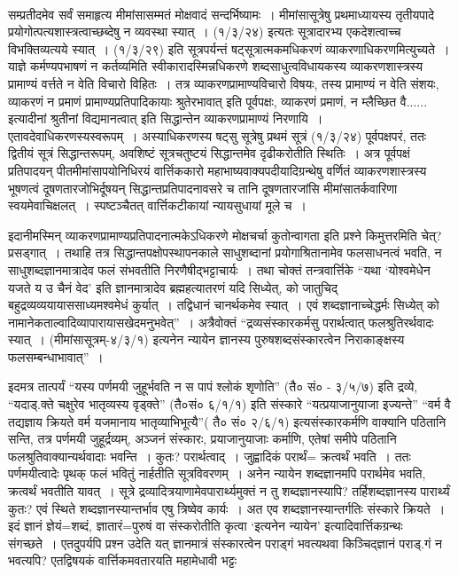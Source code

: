 {~\\[0.2cm]
सम्प्रतीदमेव सर्वं समाहृत्य मीमांसासम्मतं मोक्षवादं सन्दर्भिष्यामः~। मीमांसासूत्रेषु प्रथमाध्यायस्य तृतीयपादे प्रयोगोत्पत्यशास्त्रत्वाच्छब्देषु न व्यवस्था स्यात्~। (१/३/२४) इत्यतः सूत्रादारभ्य एकदेशत्वाच्च विभक्तिव्यत्यये स्यात्~। (१/३/२९) इति सूत्रपर्यन्तं षट्सूत्रात्मकमधिकरणं व्याकरणाधिकरणमित्युच्यते~।  याज्ञे कर्मण्यपभाषणं न कर्तव्यमिति स्वीकारादस्मिन्नधिकरणे शब्दसाधुत्वविधायकस्य व्याकरणशास्त्रस्य प्रामाण्यं वर्त्तते न वेति विचारो विहितः~। तत्र व्याकरणप्रामाण्यविचारो विषयः, तस्य प्रामाण्यं न वेति संशयः, व्याकरणं न प्रमाणं प्रामाण्यप्रतिपादिकायाः श्रुतेरभावात् इति पूर्वपक्षः, व्याकरणं प्रमाणं, न म्लैच्छित वै...... इत्यादीनां श्रुतीनां विद्यमानत्वात् इति सिद्धान्तेन व्याकरणप्रामाण्यं निरणायि~। एतावदेवाधिकरणस्यस्वरूपम्~। अस्याधिकरणस्य षट्सु सूत्रेषु प्रथमं सूत्रं (१/३/२४) पूर्वपक्षपरं, ततः द्वितीयं सूत्रं सिद्धान्तरूपम्, अवशिष्टं सूत्रचतुष्टयं सिद्धान्तमेव दृढीकरोतीति स्थितिः~। अत्र पूर्वपक्षं प्रतिपादयन् पीतमीमांसापयोनिधिरयं वार्त्तिककारो महाभाष्यवाक्यपदीयादिग्रन्थेषु वर्णितं व्याकरणशास्त्रस्य भूषणत्वं दूषणतारजोभिर्दूषयन् सिद्धान्तप्रतिपादनावसरे च तानि दूषणतारजांसि मीमांसातर्कवारिणा स्वयमेवाचिक्षलत्~। स्पष्टञ्चैतत् वार्त्तिकटीकायां न्यायसुधायां मूले च~। 

इदानीमस्मिन् व्याकरणप्रामाण्यप्रतिपादनात्मकेऽधिकरणे मोक्षचर्चा कुतोन्वागता इति प्रश्ने किमुत्तरमिति चेत्? प्रसड्गात्~। तथाहि तत्र सिद्धान्तपक्षोपस्थापनकाले साधुशब्दानां प्रयोगाश्रितानामेव फलसाधनत्वं भवति, न साधुशब्दज्ञानमात्रादेव फलं संभवतीति निरणैषीद्भट्टाचार्यः~। तथा चोक्तं तन्त्रवार्त्तिके “यथा ‘योश्वमेधेन यजते य उ चैनं वेद’ इति ज्ञानमात्रादेव ब्रह्महत्यातरणं यदि सिध्येत्, को जातुचिद् बहुद्रव्यव्ययायाससाध्यमश्वमेधं कुर्यात्~। तद्विधानं चानर्थकमेव स्यात्~। एवं शब्दज्ञानाच्चेद्धर्मः सिध्येत् को नामानेकताल्वादिव्यापारायासखेदमनुभवेत्”~। अत्रैवोक्तं “द्रव्यसंस्कारकर्मसु परार्थत्वात् फलश्रुतिरर्थवादः स्यात्~। (मीमांसासूत्रम्-४/३/१) इत्यनेन न्यायेन ज्ञानस्य पुरुषशब्दसंस्कारत्वेन निराकाङ्क्षस्य फल\-सम्बन्धाभावात्”~। 

इदमत्र तात्पर्यं  “यस्य पर्णमयी जुहूर्भवति न स पापं श्लोकं शृणोति” (तै० सं० - ३/५/७) इति द्रव्ये, “यदाड्.क्ते चक्षुरेव भातृव्यस्य वृड्क्ते” (तै०सं० ६/­१/१) इति संस्कारे “यत्प्रयाजानुयाजा इज्यन्ते” “वर्म वै तद्यज्ञाय क्रियते वर्म यजमानाय भातृव्याभिभूत्यै”\break ( तै० सं० २/६/१) इत्यसंस्कारकर्मणि वाक्यानि पठितानि सन्ति, तत्र पर्णमयी जुहूर्द्रव्यम्, अञ्जनं संस्कारः, प्रयाजानुयाजाः कर्माणि, एतेषां समीपे पठितानि फलश्रुतिवाक्यान्यर्थवादाः भवन्ति~। कुतः? परार्थत्वाद्~। जुह्वादिकं परार्थं= क्रत्वर्थं भवति~। ततः पर्णमयीत्वादेः पृथक् फलं भवितुं नार्हतीति सूत्रविवरणम्~। अनेन न्यायेन शब्दज्ञानमपि परार्थमेव भवति, क्रत्वर्थं भवतीति यावत्~। सूत्रे द्रव्यादित्रयाणामेवपारार्थ्यमुक्तं न तु शब्दज्ञानस्यापि? तर्हिशब्दज्ञानस्य पारार्थ्यं कुतः? एवं स्थिते शब्दज्ञानस्यान्तर्भाव एषु त्रिष्वेव कार्यः~। अत एव शब्दज्ञानस्यान्तर्गतिः संस्कारे क्रियते~। इदं ज्ञानं ज्ञेयं=शब्दं, ज्ञातारं=पुरुषं वा संस्करोतीति कृत्वा ‘इत्यनेन न्यायेन’ इत्यादिवार्त्तिकग्रन्थः संगच्छते~। एतदुपर्यपि प्रश्न उदेति यत् ज्ञानमात्रं संस्कारत्वेन पराड्गं भवत्यथवा किञ्चिद्ज्ञानं पराड्.गं न भवत्यपि? एतद्विषयकं वार्त्तिकमवतारयति महामेधावी भट्टः 

}
